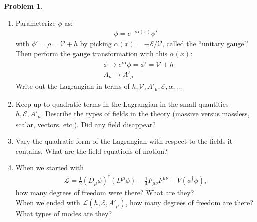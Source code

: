\documentclass{book}
\numberwithin{equation}{section}
\theoremstyle{definition}
\newtheorem{prob}{Problem}[section]
\newcommand{\lag}{\mathcal{L}}
\begin{document}
\begin{prob}
\begin{enumerate}
		
		\item Parameterize $\phi$ as:
		\begin{align}
		\phi = e^{-i\alpha(x)}\phi'
		\end{align}
		with $\phi' = \rho = \mathcal{V} + h$ by picking $\alpha(x) = -\mathcal{E}/\mathcal{V}$, called the ``unitary gauge.'' Then perform the gauge transformation with this $\alpha(x)$:
		\begin{align}
		&\phi \to e^{i\alpha}\phi = \phi' = \mathcal{V}+ h\\
		&A_\mu \to A'_\mu
		\end{align}
		Write out the Lagrangian in terms of $h,\mathcal{V}, A'_\mu, \mathcal{E}, \alpha,\dots$\\
		
		
		
		
		\item Keep up to quadratic terms in the Lagrangian in the small quantities $h,\mathcal{E}, A'_\mu$. Describe the types of fields in the theory (massive versus massless, scalar, vectors, etc.). Did any field disappear?\\
		
		
		\item Vary the quadratic form of the Lagrangian with respect to the fields it contains. What are the field equations of motion?\\
		
		
		\item When we started with 
		\begin{align}
		\lag = \frac{1}{2}(D_\mu\phi)^\dagger(D^\mu\phi) - \frac{1}{4}F_{\mu\nu}F^{\mu\nu} - V(\phi^\dagger\phi),
		\end{align}
		how many degrees of freedom were there? What are they?\\
		
		When we ended with $\lag(h,\mathcal{E}, A'_\mu)$, how many degrees of freedom are there? What types of modes are they?\\
		
	\end{enumerate}


\end{prob}
\end{document}
